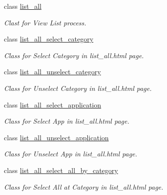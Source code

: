 \begin{CompactItemize}
class \hyperlink{classweb__winsol_1_1list__all}{list\_\-all}
\begin{CompactList}\small\item\em Clast for {\em View\/} {\em List\/} process. \item\end{CompactList}\item 
class \hyperlink{classweb__winsol_1_1list__all__select__category}{list\_\-all\_\-select\_\-category}
\begin{CompactList}\small\item\em Class for {\em Select\/} {\em Category\/} in {\em list\_\-all.html\/} page. \item\end{CompactList}\item 
class \hyperlink{classweb__winsol_1_1list__all__unselect__category}{list\_\-all\_\-unselect\_\-category}
\begin{CompactList}\small\item\em Class for {\em Unselect\/} {\em Category\/} in {\em list\_\-all.html\/} page. \item\end{CompactList}\item 
class \hyperlink{classweb__winsol_1_1list__all__select__application}{list\_\-all\_\-select\_\-application}
\begin{CompactList}\small\item\em Class for {\em Select\/} {\em App\/} in {\em list\_\-all.html\/} page. \item\end{CompactList}\item 
class \hyperlink{classweb__winsol_1_1list__all__unselect__application}{list\_\-all\_\-unselect\_\-application}
\begin{CompactList}\small\item\em Class for {\em Unselect\/} {\em App\/} in {\em list\_\-all.html\/} page. \item\end{CompactList}\item 
class \hyperlink{classweb__winsol_1_1list__all__select__all__by__category}{list\_\-all\_\-select\_\-all\_\-by\_\-category}
\begin{CompactList}\small\item\em Class for {\em Select\/} {\em All\/} {\em at\/} {\em Category\/} in {\em list\_\-all.html\/} page. \item\end{CompactList}\item 

\end{CompactItemize}

